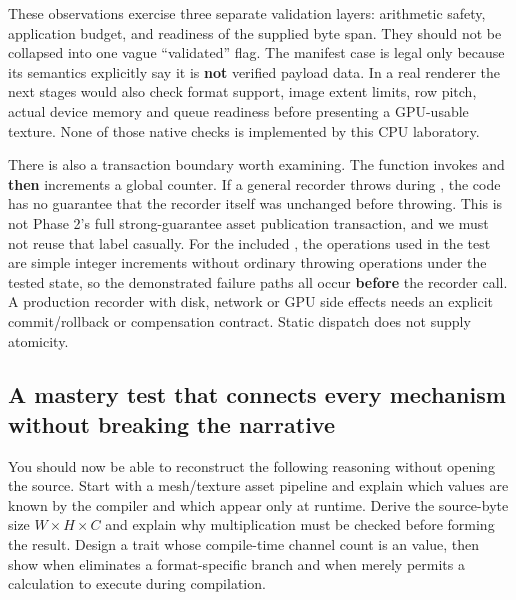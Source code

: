 These observations exercise three separate validation layers: arithmetic safety, application budget, and readiness of the supplied byte span. They should not be collapsed into one vague ``validated'' flag. The manifest case is legal only because its semantics explicitly say it is \textbf{not} verified payload data. In a real renderer the next stages would also check format support, image extent limits, row pitch, actual device memory and queue readiness before presenting a GPU-usable texture. None of those native checks is implemented by this CPU laboratory.

There is also a transaction boundary worth examining. The  function invokes  and \textbf{then} increments a global counter. If a general recorder throws during , the code has no guarantee that the recorder itself was unchanged before throwing. This is not Phase 2's full strong-guarantee asset publication transaction, and we must not reuse that label casually. For the included , the operations used in the test are simple integer increments without ordinary throwing operations under the tested state, so the demonstrated failure paths all occur \textbf{before} the recorder call. A production recorder with disk, network or GPU side effects needs an explicit commit/rollback or compensation contract. Static dispatch does not supply atomicity.

\subsection{A mastery test that connects every mechanism without breaking the narrative}\label{01-foundations-i-ch005-a-mastery-test-that-connects-every-mechanism-without-breaking-the-narrative}

\hypertarget{01-foundations-i-ch005-a-mastery-test-that-connects-every-mechanism-without-breaking-the-narrative}{}

You should now be able to reconstruct the following reasoning without opening the source. Start with a mesh/texture asset pipeline and explain which values are known by the compiler and which appear only at runtime. Derive the source-byte size \(W\times H\times C\) and explain why multiplication must be checked before forming the result. Design a trait whose compile-time channel count is an  value, then show when  eliminates a format-specific branch and when  merely permits a calculation to execute during compilation.

